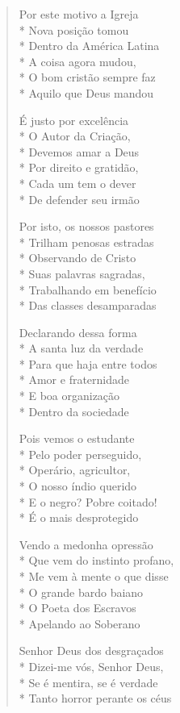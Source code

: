 \begin{verse}
Por este motivo a Igreja\\*
Nova posição tomou\\*
Dentro da América Latina\\*
A coisa agora mudou,\\*
O bom cristão sempre faz\\*
Aquilo que Deus mandou

É justo por excelência\\*
O Autor da Criação,\\*
Devemos amar a Deus\\*
Por direito e gratidão,\\*
Cada um tem o dever\\*
De defender seu irmão

Por isto, os nossos pastores\\*
Trilham penosas estradas\\*
Observando de Cristo\\*
Suas palavras sagradas,\\*
Trabalhando em benefício\\*
Das classes desamparadas

Declarando dessa forma\\*
A santa luz da verdade\\*
Para que haja entre todos\\*
Amor e fraternidade\\*
E boa organização\\*
Dentro da sociedade

Pois vemos o estudante\\*
Pelo poder perseguido,\\*
Operário, agricultor,\\*
O nosso índio querido\\*
E o negro? Pobre coitado!\\*
É o mais desprotegido

Vendo a medonha opressão\\*
Que vem do instinto profano,\\*
Me vem à mente o que disse\\*
O grande bardo baiano\\*
O Poeta dos Escravos\\*
Apelando ao Soberano

Senhor Deus dos desgraçados\\*
Dizei-me vós, Senhor Deus,\\*
Se é mentira, se é verdade\\*
Tanto horror perante os céus


\end{verse}
